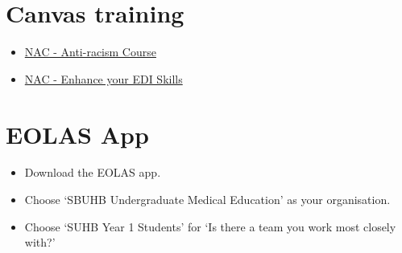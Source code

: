 \section{Canvas training}

\begin{itemize}
    \item \href{https://canvas.swansea.ac.uk/enroll/KTCJNL?enrolled=1}{NAC - Anti-racism Course}
    \item \href{https://canvas.swansea.ac.uk/enroll/N8KECX}{NAC - Enhance your EDI Skills}
\end{itemize}

\section{EOLAS App}

\begin{itemize}
    \item Download the EOLAS app.
    \item Choose `SBUHB Undergraduate Medical
Education' as your organisation.
\item Choose `SUHB Year 1 Students' for `Is there a team you work most closely with?'
\end{itemize}

